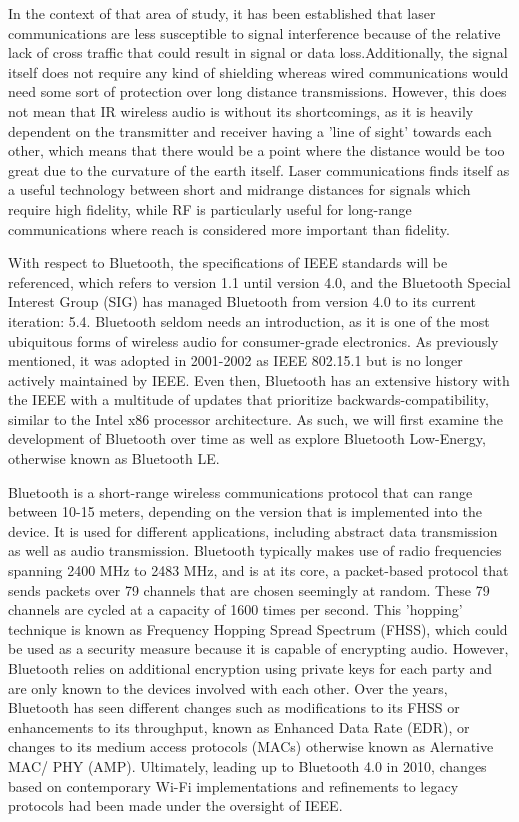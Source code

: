 \documentclass[conference]{IEEEtran}
\begin{document}
In the context of that area of study, it has been established that laser communications are
less susceptible to signal interference because of the relative lack of cross traffic that
could result in signal or data loss.Additionally, the signal itself does not require any kind
of shielding whereas wired communications would need some sort of protection over long
distance transmissions. However, this does not mean that IR wireless audio is without its
shortcomings, as it is heavily dependent on the transmitter and receiver having a 'line of
sight' towards each other, which means that there would be a point where the distance would
be too great due to the curvature of the earth itself. Laser communications finds itself as a
useful technology between short and midrange distances for signals which require high
fidelity, while RF is particularly useful for long-range communications where reach is
considered more important than fidelity.\cite{anthony_approach_2021}

With respect to Bluetooth, the specifications of IEEE standards will be referenced, which
refers to version 1.1 until version 4.0, and the Bluetooth Special Interest Group (SIG) has
managed Bluetooth from version 4.0 to its current iteration: 5.4. Bluetooth seldom needs an
introduction, as it is one of the most ubiquitous forms of wireless audio for consumer-grade
electronics. As previously mentioned, it was adopted in 2001-2002 as IEEE 802.15.1 but is no
longer actively maintained by IEEE.\cite{bhalla_unraveling_2021} Even then, Bluetooth has an
extensive history with the IEEE with a multitude of updates that prioritize
backwards-compatibility, similar to the Intel x86 processor architecture.
\cite{noauthor_bluetooth_nodate} As such, we will first examine the development of Bluetooth
over time as well as explore Bluetooth Low-Energy, otherwise known as Bluetooth LE.
\cite{bhalla_unraveling_2021}

Bluetooth is a short-range wireless communications protocol that can range between 10-15
meters, depending on the version that is implemented into the device. It is used for
different applications, including abstract data transmission as well as audio transmission.
Bluetooth typically makes use of radio frequencies spanning 2400 MHz to 2483 MHz, and is at
its core, a packet-based protocol that sends packets over 79 channels that are chosen
seemingly at random. These 79 channels are cycled at a capacity of 1600 times per second.
This 'hopping' technique is known as Frequency Hopping Spread Spectrum (FHSS), which could be
used as a security measure because it is capable of encrypting audio. However, Bluetooth
relies on additional encryption using private keys for each party and are only known to the
devices involved with each other. Over the years, Bluetooth has seen different changes such
as modifications to its FHSS or enhancements to its throughput, known as Enhanced Data Rate
(EDR), or changes to its medium access protocols (MACs) otherwise known as Alernative MAC/
PHY (AMP). Ultimately, leading up to Bluetooth 4.0 in 2010, changes based on contemporary
Wi-Fi implementations and refinements to legacy protocols had been made under the oversight
of IEEE.\cite{noauthor_bluetooth_nodate}
\end{document}
